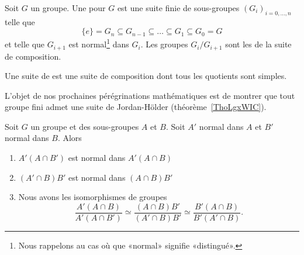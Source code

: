\begin{definition}  \label{DefJWZSooNcntfK}
Soit \( G\) un groupe. Une  pour \( G\) est une suite finie de sous-groupes \( (G_i)_{i=0,\ldots, n}\) telle que
\begin{equation}
    \{ e \}=G_n\subseteq G_{n-1}\subseteq\ldots\subseteq G_1\subseteq G_0=G
\end{equation}
et telle que \( G_{i+1}\) est normal\footnote{Nous rappelons au cas où que «normal» signifie «distingué».} dans \( G_i\). Les groupes \( G_i/G_{i+1}\) sont les  de la suite de composition.

    Une suite de  est une suite de composition dont tous les quotients sont simples.
\end{definition}
L'objet de nos prochaines pérégrinations mathématiques est de montrer que tout groupe fini admet une suite de Jordan-Hölder (théorème~\ref{ThoLgxWIC}).

\begin{lemma}\label{LemsKpXCG}
    Soit \( G\) un groupe et des sous-groupes \( A\) et \( B\). Soit \( A'\) normal dans \( A\) et \( B'\) normal dans \( B\). Alors
    \begin{enumerate}
        \item
            \( A'(A\cap B')\) est normal dans \( A'(A\cap B)\)
        \item
            \( (A'\cap B)B'\) est normal dans \( (A\cap B)B'\)
        \item
            Nous avons les isomorphismes de groupes
            \begin{equation}
                \frac{ A'(A\cap B) }{ A'(A\cap B') }\simeq\frac{ (A\cap B)B' }{ (A'\cap B)B' }\simeq\frac{ B'(A\cap B) }{ B'(A'\cap B) }.
            \end{equation}
    \end{enumerate}
\end{lemma}


